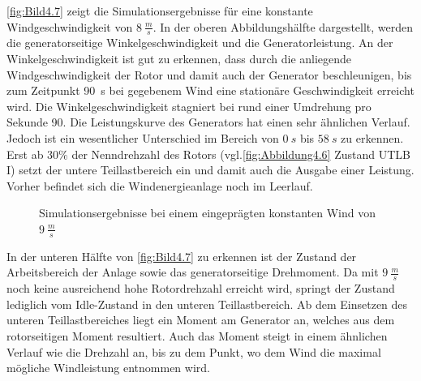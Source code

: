 \autoref{fig:Bild4.7} zeigt die Simulationsergebnisse für eine konstante Windgeschwindigkeit von $\SI{8}{\frac{m}{s}}$. In der oberen Abbildungshälfte dargestellt, werden die generatorseitige Winkelgeschwindigkeit und die Generatorleistung. An der Winkelgeschwindigkeit ist gut zu erkennen, dass durch die anliegende Windgeschwindigkeit der Rotor und damit auch der Generator beschleunigen, bis \ca zum Zeitpunkt \SI{90}{s} bei gegebenem Wind eine stationäre Geschwindigkeit erreicht wird. Die Winkelgeschwindigkeit stagniert bei rund einer Umdrehung pro Sekunde \bzw \SI{90}{}. Die Leistungskurve des Generators hat einen sehr ähnlichen Verlauf. Jedoch ist ein wesentlicher Unterschied im Bereich von $\SI{0}{s}$ bis $\SI{58}{s}$ zu erkennen. Erst ab $30\%$ der Nenndrehzahl des Rotors (vgl.\xspace \autoref{fig:Abbildung4.6} Zustand UTLB $\mathrm{I}$) setzt der untere Teillastbereich ein und damit auch die Ausgabe einer Leistung. Vorher befindet sich die Windenergieanlage noch im Leerlauf.

\begin{figure}[H]
   \centering
   \caption[Simulationsergebnisse langsamer konstanter Wind]{Simulationsergebnisse bei einem eingeprägten konstanten Wind von $\SI{9}{\frac{m}{s}}$}
   \label{fig:Bild4.7}
\end{figure}

In der unteren Hälfte von \autoref{fig:Bild4.7} zu erkennen ist der Zustand \bzw der Arbeitsbereich der Anlage sowie das generatorseitige Drehmoment. Da mit $\SI{9}{\frac{m}{s}}$ noch keine ausreichend hohe Rotordrehzahl erreicht wird, springt der Zustand lediglich vom Idle-Zustand in den unteren Teillastbereich. Ab dem Einsetzen des unteren Teillastbereiches liegt ein Moment am Generator an, welches aus dem rotorseitigen Moment resultiert. Auch das Moment steigt in einem ähnlichen Verlauf wie die Drehzahl an, bis zu dem Punkt, wo dem Wind die maximal mögliche Windleistung entnommen wird.\\


